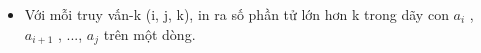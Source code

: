 \begin{itemize}
	\item     Với mỗi truy vấn-k (i, j, k), in ra số phần tử lớn hơn k trong dãy con $a_{i}$    ,   $a_{i+1}$    , ..., $a_{j}$    trên một dòng.    


\end{itemize}